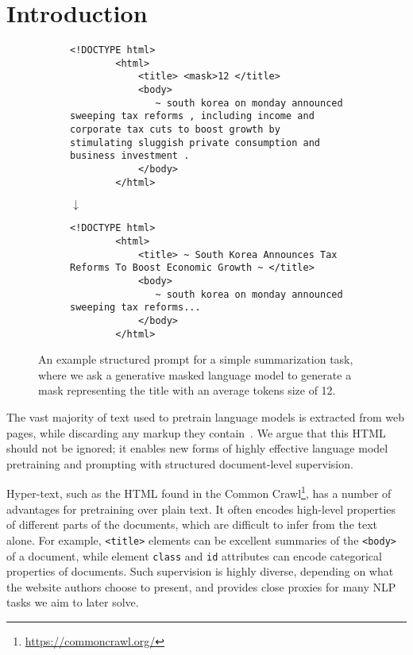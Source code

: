 \documentclass[11pt,a4paper]{article}
\begin{document}
\section{Introduction}
\begin{figure}
\centering
\begin{subfigure}[b]{0.45\textwidth}
   \centering
    \begin{lstlisting}[numbers=none, basicstyle=\tiny\ttfamily]
        <!DOCTYPE html>
        <html>
            <title> <mask>12 </title>
            <body>
               ~ south korea on monday announced sweeping tax reforms , including income and corporate tax cuts to boost growth by stimulating sluggish private consumption and business investment .
            </body>
        </html>
    \end{lstlisting}
    $\downarrow$
\end{subfigure}
\begin{subfigure}[b]{0.45\textwidth}
   \centering
   \begin{lstlisting}[numbers=none, basicstyle=\tiny\ttfamily]
        <!DOCTYPE html>
        <html>
            <title> ~ South Korea Announces Tax Reforms To Boost Economic Growth ~ </title>
            <body>
               ~ south korea on monday announced sweeping tax reforms...
            </body>
        </html>
    \end{lstlisting}
\end{subfigure}

\caption{An example structured prompt for a simple summarization task, where we ask a generative masked language model to generate a mask representing the title with an average tokens size of 12.}
\label{fig:example_prompt}
\end{figure}


The vast majority of text used to pretrain language models is extracted from web pages, while discarding any markup they contain~\cite{ROBERTA,gpt3,T5,BART}. We argue that this HTML should not be ignored; it enables new forms of highly effective language model pretraining and prompting with structured document-level supervision.

Hyper-text, such as the HTML found in the Common Crawl\footnote{\url{https://commoncrawl.org/}}, has a number of advantages for pretraining over plain text. It often encodes high-level properties of different parts of the documents, which are difficult to infer from the text alone. For example, \verb+<title>+ elements can be excellent summaries of the \verb+<body>+ of a document, while element \verb+class+ and \verb+id+ attributes can encode categorical properties of  documents. Such supervision is highly diverse, depending on what the website authors choose to present, and provides close proxies for many NLP tasks we aim to later solve. 
\end{document}
